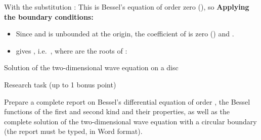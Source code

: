 \begin{EMunit}

With the substitution :
This is Bessel's equation of order zero (), so
\textbf{Applying the boundary conditions:}

\begin{itemize}
\tightlist
\item
  Since  and  is unbounded at the origin, the coefficient of  is zero () and .
\item
   gives , i.e.~, where  are the roots of :
\end{itemize}



\end{EMunit}

\begin{EMimportant}{Solution of the two-dimensional wave equation on a disc}


\end{EMimportant}

\begin{EMremark}{Research task (up to 1 bonus point)}

Prepare a complete report on Bessel's differential equation of order , the Bessel functions of the first and second kind and their properties, as well as the complete solution of the two-dimensional wave equation with a circular boundary (the report must be typed, in Word format).

\end{EMremark}
